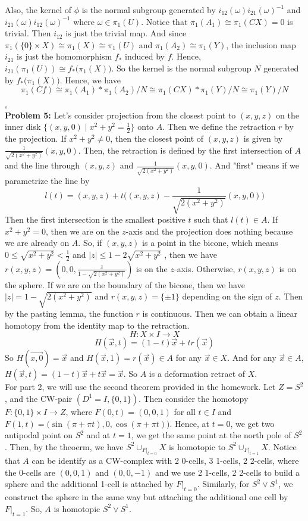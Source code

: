 \documentclass[12pt]{amsart}
\begin{document}
Also, the kernel of $\phi$ is the normal subgroup generated by $i_{12}(\omega)i_{21}(\omega)^{-1}$ and $i_{21}(\omega)i_{12}(\omega)^{-1}$ where $\omega \in \pi_1(U)$.
Notice that $\pi_1(A_1)\cong \pi_1(CX)=0$ is trivial. Then $i_{12}$ is just the trivial map.
And since $\pi_1(\{0\}\times X)\cong \pi_1(X)\cong\pi_1(U)$ and $\pi_1(A_2)\cong \pi_1(Y)$, the inclusion map $i_{21}$ is just the homomorphism $f_\ast$ induced by $f$. Hence, $i_{21}(\pi_1(U))\cong f_\ast\big(\pi_1(X)\big)$. So the kernel is the normal subgroup $N$ generated by $f_\ast\big(\pi_1(X)\big)$.
Hence, we have $$\pi_1(Cf)\cong \pi_1(A_1)\ast \pi_1(A_2)/N\cong \pi_1(CX)\ast\pi_1(Y)/N\cong \pi_1(Y)/N$$
\\\phantom{qed}\hfill$\square$\\
\textbf{Problem 5:} Let's consider projection from the closest point to $(x,y,z)$ on the inner disk $\{(x,y,0)\mid x^2+y^2=\frac{1}{2}\}$ onto $A$. Then we define the retraction $r$ by the projection. If $x^2+y^2\neq 0$, then the closest point of $(x,y,z)$ is given by $\frac{1}{\sqrt{2(x^2+y^2)}}(x,y,0)$. Then, the retraction is defined by the first intersection of $A$ and the line through $(x,y,z)$ and $\frac{1}{\sqrt{2(x^2+y^2)}}(x,y,0)$. And "first" means if we parametrize the line by
\[l(t)=(x,y,z)+t\big((x,y,z)-\frac{1}{\sqrt{2(x^2+y^2)}}(x,y,0)\big)\]
Then the first intersection is the smallest positive $t$ such that $l(t)\in A$. If $x^2+y^2=0$, then we are on the $z$-axis and the projection does nothing because we are already on $A$. So, if $(x,y,z)$ is a point in the bicone, which means $0\leq \sqrt{x^2+y^2}< \frac{1}{2}$ and $|z|\leq 1-2\sqrt{x^2+y^2}$ , then we have $r(x,y,z)=(0,0,\frac{z}{1-\sqrt{2(x^2+y^2)}})$ is on the $z$-axis. Otherwise, $r(x,y,z)$ is on the sphere. If we are on the boundary of the bicone, then we have $|z|=1-\sqrt{2(x^2+y^2)}$ and $r(x,y,z)=\{\pm 1\}$ depending on the sign of $z$. Then by the pasting lemma, the function $r$ is continuous. Then we can obtain a linear homotopy from the identity map to the retraction.
\[H:X\times I\to X\]
\[H(\vec{x},t)=(1-t)\vec{x}+tr(\vec{x})\]
So $H(\vec{x,0})=\vec{x}$ and $H(\vec{x},1)=r(\vec{x})\in A$ for any $\vec{x}\in X$. And for any $\vec{x}\in A$, $H(\vec{x},t)=(1-t)\vec{x}+t\vec{x}=\vec{x}$. So $A$ is a deformation retract of $X$.\\
For part 2, we will use the second theorem provided in the homework. Let $Z=S^2$, and the CW-pair $(D^1=I,\{0,1\})$. Then consider the homotopy $F:\{0,1\}\times I\to Z$, where $F(0,t)=(0,0,1)$ for all $t\in I$ and $F(1,t)=\big(\sin(\pi+\pi t),0,\cos(\pi+\pi t)\big)$. Hence, at $t=0$, we get two antipodal point on $S^2$ and at $t=1$, we get the same point at the north pole of $S^2$. Then, by the theoerm, we have $S^2\cup_{F|_{t=0}}X$ is homotopic to $S^2\cup_{F|_{t=1}}X$. Notice that $A$ can be identify as a CW-complex with 2 0-cells, 3 1-cells, 2 2-cells, where the 0-cells are $(0,0,1)$ and $(0,0,-1)$ and we use 2 1-cells, 2 2-cells to build a sphere and the additional 1-cell is attached by $F|_{t=0}$. Similarly, for $S^2\vee S^1$, we construct the sphere in the same way but attaching the additional one cell by $F|_{t=1}$. So, $A$ is homotopic $S^2\vee S^1$.
\end{document}
